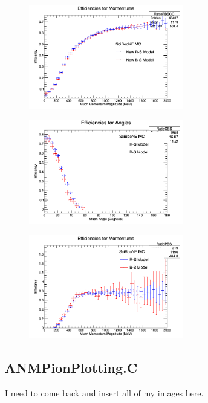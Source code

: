 \documentclass[11pt]{article}
\begin{document}
\begin{figure}[H]
\centering
\includegraphics[width=0.6\textwidth]{ANMCombinedPlotsImages/16-ANMCombinedPlots.png}
\caption{}
\end{figure}

\begin{figure}[H]
\centering
\includegraphics[width=0.6\textwidth]{ANMCombinedPlotsImages/17-ANMCombinedPlots.png}
\caption{}
\end{figure}

\begin{figure}[H]
\centering
\includegraphics[width=0.6\textwidth]{ANMCombinedPlotsImages/18-ANMCombinedPlots.png}
\caption{}
\end{figure}

\subsection{ANMPionPlotting.C}
I need to come back and insert all of my images here.
\end{document}
